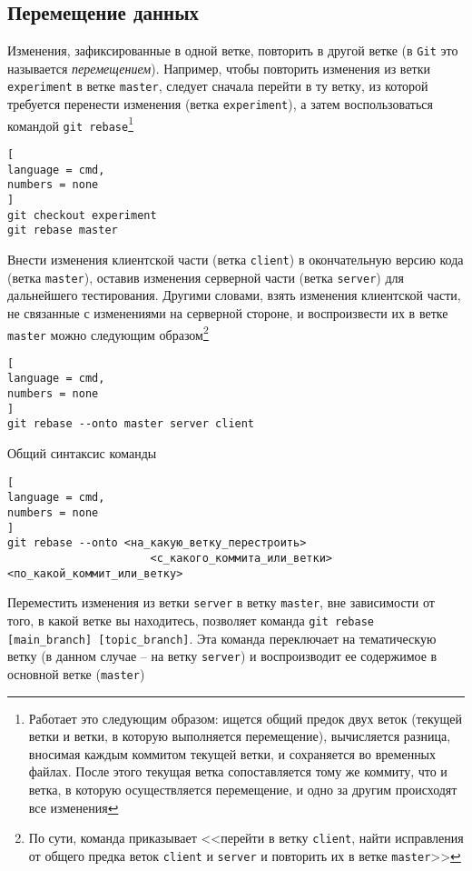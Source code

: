 \documentclass[%
	11pt,
	a4paper,
	utf8,
		]{article}
\begin{document}
\subsection{Перемещение данных}

Изменения, зафиксированные в одной ветке, повторить в другой ветке (в \texttt{Git} это называется \emph{перемещением}). Например, чтобы повторить изменения из ветки \texttt{experiment} в ветке \texttt{master}, следует сначала перейти в ту ветку, из которой требуется перенести изменения (ветка \texttt{experiment}), а затем воспользоваться командой \texttt{git rebase}\footnote{Работает это следующим образом: ищется общий предок двух веток (текущей ветки и ветки, в которую выполняется перемещение), вычисляется разница, вносимая каждым коммитом текущей ветки, и сохраняется во временных файлах. После этого текущая ветка сопоставляется тому же коммиту, что и ветка, в которую осуществляется перемещение, и одно за другим происходят все изменения}

\begin{lstlisting}[
language = cmd,
numbers = none
]
git checkout experiment
git rebase master
\end{lstlisting}


Внести изменения клиентской части (ветка \texttt{client}) в окончательную версию кода (ветка \texttt{master}), оставив изменения серверной части (ветка \texttt{server}) для дальнейшего тестирования. Другими словами, взять изменения клиентской части, не связанные с изменениями на серверной стороне, и воспроизвести их в ветке \texttt{master} можно следующим образом\footnote{По сути, команда приказывает <<перейти в ветку \texttt{client}, найти исправления от общего предка веток \texttt{client} и \texttt{server} и повторить их в ветке \texttt{master}>>}

\begin{lstlisting}[
language = cmd,
numbers = none
]
git rebase --onto master server client
\end{lstlisting}

Общий синтаксис команды
\begin{lstlisting}[
language = cmd,
numbers = none
]
git rebase --onto <на_какую_ветку_перестроить>
                      <с_какого_коммита_или_ветки> <по_какой_коммит_или_ветку>
\end{lstlisting}

Переместить изменения из ветки \texttt{server} в ветку \texttt{master}, вне зависимости от того, в какой ветке вы находитесь, позволяет команда \texttt{git rebase [main\_branch] [topic\_branch]}. Эта команда переключает на тематическую ветку (в данном случае -- на ветку \texttt{server}) и воспроизводит ее содержимое в основной ветке (\texttt{master})
\end{document}
